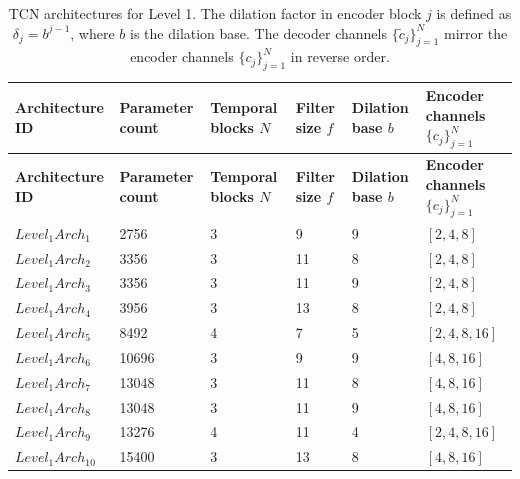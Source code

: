 \documentclass[preprint,12pt]{elsarticle}
\begin{document}
\begin{footnotesize}
\setlength{\tabcolsep}{5pt}
\renewcommand{\arraystretch}{1.3}
\begin{longtable}{p{2.2cm}p{1.8cm}p{1.6cm}p{1.4cm}p{1.6cm}p{2.0cm}}
\caption{TCN architectures for Level 1. The dilation factor in encoder block $j$ is defined as $\delta_j = b^{j-1}$, where $b$ is the dilation base. The decoder channels $\{\tilde{c}_j\}_{j=1}^{N}$ mirror the encoder channels $\{c_j\}_{j=1}^{N}$ in reverse order.}
\label{tab:level1}\\
\toprule
\textbf{Architecture ID} & \textbf{Parameter count} & \textbf{Temporal blocks $N$} & \textbf{Filter size $f$} & \textbf{Dilation base $b$} & \textbf{Encoder channels $\{c_j\}_{j=1}^{N}$} \\
\midrule
\endfirsthead

\toprule
\textbf{Architecture ID} & \textbf{Parameter count} & \textbf{Temporal blocks $N$} & \textbf{Filter size $f$} & \textbf{Dilation base $b$} & \textbf{Encoder channels $\{c_j\}_{j=1}^{N}$} \\
\midrule
\endhead

\endfoot

\bottomrule
\endlastfoot

$Level_1Arch_1$    & 2756  & 3 & 9  & 9 & $[2, 4, 8]$    \\
$Level_1Arch_2$    & 3356  & 3 & 11 & 8 & $[2, 4, 8]$    \\
$Level_1Arch_3$    & 3356  & 3 & 11 & 9 & $[2, 4, 8]$    \\
$Level_1Arch_4$    & 3956  & 3 & 13 & 8 & $[2, 4, 8]$    \\
$Level_1Arch_5$    & 8492  & 4 & 7  & 5 & $[2, 4, 8, 16]$ \\
$Level_1Arch_6$    & 10696 & 3 & 9  & 9 & $[4, 8, 16]$   \\
$Level_1Arch_7$    & 13048 & 3 & 11 & 8 & $[4, 8, 16]$   \\
$Level_1Arch_8$    & 13048 & 3 & 11 & 9 & $[4, 8, 16]$   \\
$Level_1Arch_9$    & 13276 & 4 & 11 & 4 & $[2, 4, 8, 16]$ \\
$Level_1Arch_{10}$ & 15400 & 3 & 13 & 8 & $[4, 8, 16]$   \\
\end{longtable}
\end{footnotesize}
\end{document}
